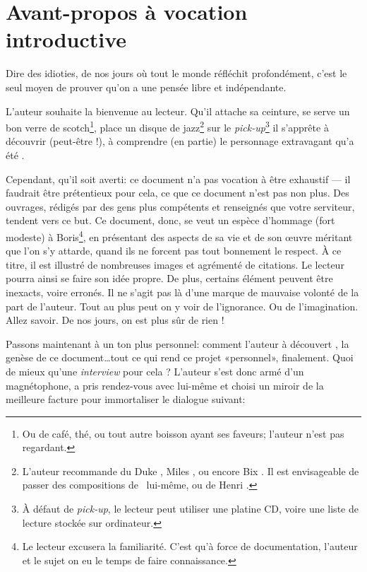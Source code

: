 \frontmatter

\chapter{Avant-propos à vocation introductive}
\epigraph{Dire des idioties, de nos jours où tout le monde réfléchit profondément, c'est le seul moyen de prouver qu'on a une pensée libre et indépendante.}{\BV}
\vfill
\pagebreak

L'auteur souhaite la bienvenue au lecteur. Qu'il attache sa ceinture,
se serve un bon verre de scotch\footnote{Ou de café, thé, ou tout autre
boisson ayant ses faveurs; l'auteur n'est pas regardant.}, place un
disque de jazz\footnote{L'auteur recommande du Duke , 
Miles , ou encore Bix . Il est envisageable de
passer des compositions de \BV\ lui-même, ou de Henri .}
sur le \emph{pick-up}\footnote{À défaut de \emph{pick-up},
le lecteur peut utiliser une platine CD, voire une liste de lecture
stockée sur ordinateur.}
il s'apprête à découvrir (peut-être !), à comprendre (en partie) le
personnage extravagant qu'a été \BV.

Cependant, qu'il soit averti: ce document n'a pas vocation à être exhaustif
--- il faudrait être prétentieux pour cela, ce que ce document n'est pas
non plus. Des ouvrages, rédigés par des gens plus compétents et renseignés
que votre serviteur, tendent vers ce but.
Ce document, donc, se veut un espèce d'hommage (fort modeste) à
Boris\footnote{Le lecteur excusera la familiarité. C'est qu'à force de
documentation, l'auteur et le sujet on eu le temps de faire connaissance.},
en présentant des aspects de sa vie et de son \oe{}uvre méritant
que l'on s'y attarde, quand ils ne forcent pas tout bonnement le respect.
À ce titre, il est illustré de nombreuses images et agrémenté
de citations. Le lecteur pourra ainsi se faire son idée propre. De plus, 
certains élément peuvent être inexacts, voire erronés. Il ne
s'agit pas là d'une marque de mauvaise volonté de la part de l'auteur. Tout
au plus peut on y voir de l'ignorance. Ou de l'imagination. Allez savoir.
De nos jours, on est plus sûr de rien !


Passons maintenant à un ton plus personnel: comment l'auteur à
 découvert \BV, la genèse de ce document\ldots tout ce qui rend ce projet «personnel», finalement.
Quoi de mieux qu'une \emph{interview} pour cela ?
L'auteur s'est donc armé d'un magnétophone, a pris rendez-vous avec lui-même
et choisi un miroir de la meilleure facture pour immortaliser le dialogue suivant:

